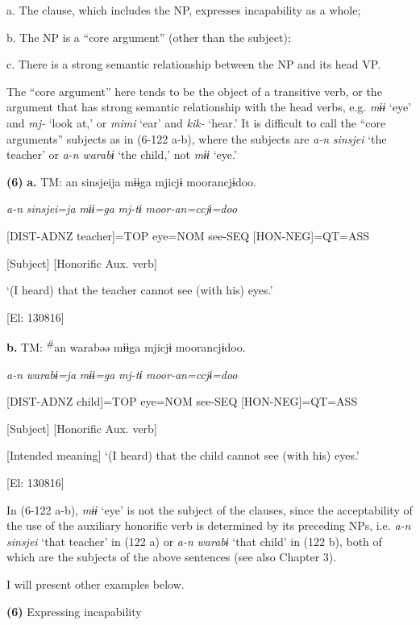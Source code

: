   a.   The clause, which includes the NP, expresses incapability as a whole;

  b.  The NP is a “core argument” (other than the subject);

  c.  There is a strong semantic relationship between the NP and its head VP.

The “core argument” here tends to be the object of a transitive verb, or the argument that has strong semantic relationship with the head verbs, e.g. \textit{mɨɨ} ‘eye’ and \textit{mj-} ‘look at,’ or \textit{mimi} ‘ear’ and \textit{kik-} ‘hear.’ It is difficult to call the “core arguments” subjects as in (6-122 a-b), where the subjects are \textit{a-n} \textit{sinsjei} ‘the teacher’ or \textit{a-n} \textit{warabɨ} ‘the child,’ not \textit{mɨɨ} ‘eye.’

\textbf{(6)}  \textbf{a.}  TM:  an  sinsjeija  mɨɨga  mjicjɨ  moorancjɨdoo.

      \textit{a-n}  \textit{sinsjei=ja}  \textit{mɨɨ=ga}  \textit{mj-tɨ}  \textit{moor-an=ccjɨ=doo}

      [DIST-ADNZ  teacher]=TOP  eye=NOM  see-SEQ  [HON-NEG]=QT=ASS

      [Subject]      [Honorific Aux. verb]

      ‘(I heard) that the teacher cannot see (with his) eyes.’

      [El: 130816]

  \textbf{b.}  TM:  \textsuperscript{\#}an  warabəə  mɨɨga  mjicjɨ  moorancjɨdoo.

       \textit{a-n}  \textit{warabɨ=ja}  \textit{mɨɨ=ga}  \textit{mj-tɨ}  \textit{moor-an=ccjɨ=doo}

      [DIST-ADNZ  child]=TOP  eye=NOM  see-SEQ  [HON-NEG]=QT=ASS

      [Subject]      [Honorific Aux. verb]

      [Intended meaning] ‘(I heard) that the child cannot see (with his) eyes.’

      [El: 130816]

In (6-122 a-b), \textit{mɨɨ} ‘eye’ is not the subject of the clauses, since the acceptability of the use of the auxiliary honorific verb is determined by its preceding NPs, i.e. \textit{a-n} \textit{sinsjei} ‘that teacher’ in (122 a) or \textit{a-n} \textit{warabɨ} ‘that child’ in (122 b), both of which are the subjects of the above sentences (see also Chapter 3).

  I will present other examples below.

\textbf{(6)}  Expressing incapability


